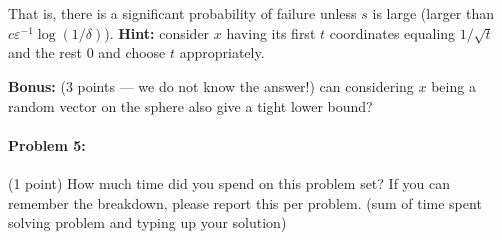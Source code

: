 \documentclass[12pt]{article}
\newcommand{\eps}{\varepsilon}
\begin{document}
That is, there is a significant probability of failure unless $s$ is large (larger than $c\eps^{-1}\log(1/\delta)$). \textbf{Hint:} consider $x$ having its first $t$ coordinates equaling $1/\sqrt t$ and the rest $0$ and choose $t$ appropriately.

\medskip

\noindent\textbf{Bonus:} (3 points --- we do not know the answer!) can considering $x$ being a random vector on the sphere also  give a tight lower bound?


\paragraph{Problem 5:} (1 point) How much time did you spend on this problem set? If you can remember the breakdown, please report this per problem. (sum of time spent solving problem and typing up your solution)
\end{document}
